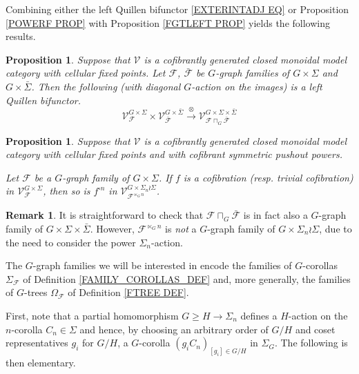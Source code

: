 \documentclass[a4paper,10pt
,draft
]{article}%
\numberwithin{equation}{section}
\numberwithin{figure}{section}
\newtheorem{proposition}[equation]{Proposition}%
\theoremstyle{definition} %
\newtheorem{remark}[equation]{Remark}%
\newcommand{\1}{\ensuremath{\mathbbm 1}}%
\begin{document}
Combining either the left Quillen bifunctor \eqref{EXTERINTADJ EQ} or 
Proposition \ref{POWERF PROP}
with Proposition \ref{FGTLEFT PROP} yields the following results.


\begin{proposition}\label{EXTERINTADJG PROP}
Suppose that $\mathcal{V}$ is a cofibrantly generated closed monoidal model category with cellular fixed points.
Let $\mathcal{F}$, $\bar{\mathcal{F}}$ be $G$-graph families of 
$G \times \Sigma$ and $G \times \bar{\Sigma}$. Then the following (with diagonal $G$-action on the images) 
is a left Quillen bifunctor.
\[
	\mathcal{V}^{G \times \Sigma}_{\mathcal{F}}
		\times
	\mathcal{V}^{G \times \bar{\Sigma}}_{\bar{\mathcal{F}}}
		\xrightarrow{\otimes}
		\mathcal{V}^{G \times \Sigma \times \bar{\Sigma}}_{
	\mathcal{F} \sqcap_G \bar{\mathcal{F}}}
\]
\end{proposition}


\begin{proposition}\label{POWERFG PROP}
        Suppose that $\mathcal{V}$ is a cofibrantly generated closed monoidal model category with cellular fixed points and with cofibrant symmetric pushout powers.
	
	Let $\mathcal{F}$ be a $G$-graph family of $G \times \Sigma$. If $f$ is a cofibration (resp. trivial cofibration) in
	$\mathcal{V}^{G \times \Sigma}_{\mathcal{F}}$,
	then so is $f^{\square n}$
        in 
	$\mathcal{V}^{G \times \Sigma_n \wr \Sigma}_{\mathcal{F}^{\ltimes_{G} n}}$.
\end{proposition}


\begin{remark}
        It is straightforward to check that 
        $\mathcal{F} \sqcap_G \bar{\mathcal{F}}$
	is in fact also a $G$-graph family of $G \times \Sigma \times \bar{\Sigma}$.
	However, $\mathcal{F}^{\ltimes_G n}$ is \textit{not}
	a $G$-graph family of $G \times \Sigma_n \wr \Sigma$,
	due to the need to consider the power $\Sigma_n$-action.
\end{remark}

The $G$-graph families we will be interested in
encode the families of $G$-corollas 
 $\Sigma_{\mathcal{F}}$
of Definition \ref{FAMILY_COROLLAS_DEF} and,
more generally, the families of $G$-trees 
$\Omega_{\mathcal{F}}$ 
of Definition \ref{FTREE DEF}. 

First, note that a partial homomorphism
$G \geq H \to \Sigma_n$
defines a $H$-action on the $n$-corolla $C_n \in \Sigma$
and hence, by choosing an arbitrary order of 
$G/H$ and coset representatives $g_i$ for $G/H$, a $G$-corolla
$(g_i C_n)_{[g_i] \in G/H}$ in $\Sigma_G$. The following is then elementary.
\end{document}
